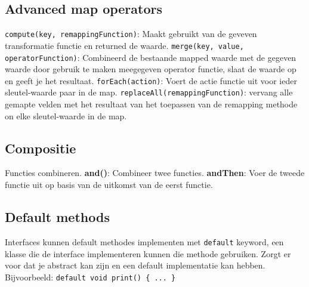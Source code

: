 \subsection{Advanced map operators}
\texttt{compute(key, remappingFunction)}: Maakt gebruikt van de geveven transformatie functie en returned de waarde.
\texttt{merge(key, value, operatorFunction)}: Combineerd de bestaande mapped waarde met de gegeven waarde door gebruik te maken meegegeven operator functie, slaat de waarde op en geeft je het resultaat.
\texttt{forEach(action)}: Voert de actie functie uit voor ieder sleutel-waarde paar in de map.
\texttt{replaceAll(remappingFunction)}: vervang alle gemapte velden met het resultaat van het toepassen van de remapping methode on elke sleutel-waarde in de map.

\subsection{Compositie}
Functies combineren.
\textbf{and()}: Combineer twee functies.
\textbf{andThen}: Voer de tweede functie uit op basis van de uitkomst van de eerst functie.

\subsection{Default methods}
Interfaces kunnen default methodes implementen met \texttt{default} keyword, een klasse die de interface implementeren kunnen die methode gebruiken.
Zorgt er voor dat je abstract kan zijn en een default implementatie kan hebben.
Bijvoorbeeld: \texttt{default void print() \{ ... \}}
